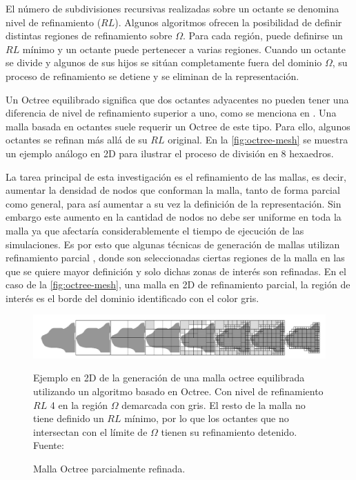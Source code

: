 El número de subdivisiones recursivas realizadas sobre un octante se denomina nivel de refinamiento ($RL$). Algunos algoritmos ofrecen la posibilidad de definir distintas regiones de refinamiento sobre $\Omega$. Para cada región, puede definirse un $RL$ mínimo y un octante puede pertenecer a varias regiones. Cuando un octante se divide y algunos de sus hijos se sitúan completamente fuera del dominio $\Omega$, su proceso de refinamiento se detiene y se eliminan de la representación.

Un Octree equilibrado significa que dos octantes adyacentes no pueden tener una diferencia de nivel de refinamiento superior a uno, como se menciona en \cite{daines2018repairing}. Una malla basada en octantes suele requerir un Octree de este tipo. Para ello, algunos octantes se refinan más allá de su $RL$ original. En la \autoref{fig:octree-mesh} se muestra un ejemplo análogo en 2D para ilustrar el proceso de división en 8 hexaedros.

La tarea principal de esta investigación es el refinamiento de las mallas, es decir, aumentar la densidad de nodos que conforman la malla, tanto de forma parcial como general, para así aumentar a su vez la definición de la representación. Sin embargo este aumento en la cantidad de nodos no debe ser uniforme en toda la malla ya que afectaría considerablemente el tiempo de ejecución de las simulaciones. Es por esto que algunas técnicas de generación de mallas utilizan refinamiento parcial \cite{lobos2015mixed}, donde son seleccionadas ciertas regiones de la malla en las que se quiere mayor definición y solo dichas zonas de interés son refinadas. En el caso de la \autoref{fig:octree-mesh}, una malla en 2D de refinamiento parcial, la región de interés es el borde del dominio identificado con el color gris.

\begin{figure}[!ht]
    \centering
    \includegraphics[width=1.0\textwidth]{figures/divison-process.png}
    \caption{\label{fig:octree-mesh} Malla Octree parcialmente refinada.}
    \small{Ejemplo en 2D de la generación de una malla octree equilibrada utilizando un algoritmo basado en Octree.
    Con nivel de refinamiento $RL$ 4 en la región $\Omega$ demarcada con gris. El resto de la malla no tiene definido un $RL$ mínimo, por lo que los octantes que no intersectan con el límite de $\Omega$ tienen su refinamiento detenido.} \\
    Fuente: \cite{lobos2015mixed}
\end{figure}

